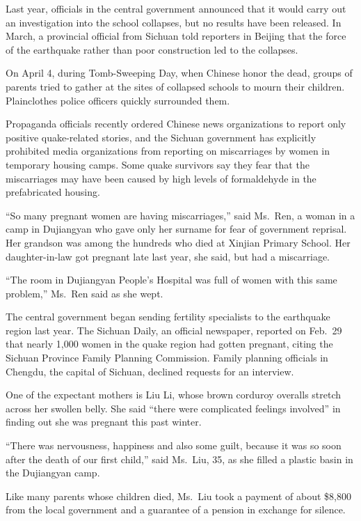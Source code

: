 \documentclass[12pt,a4paper,onecolumn]{article}
\begin{document}
Last year, officials in the central government announced that it would carry out an investigation
into the school collapses, but no results have been released. In March, a provincial official from
Sichuan told reporters in Beijing that the force of the earthquake rather than poor construction led
to the collapses.

On April 4, during Tomb-Sweeping Day, when Chinese honor the dead, groups of parents tried to gather
at the sites of collapsed schools to mourn their children. Plainclothes police officers quickly
surrounded them.

Propaganda officials recently ordered Chinese news organizations to report only positive
quake-related stories, and the Sichuan government has explicitly prohibited media organizations from
reporting on miscarriages by women in temporary housing camps. Some quake survivors say they fear
that the miscarriages may have been caused by high levels of formaldehyde in the prefabricated
housing.

``So many pregnant women are having miscarriages,'' said Ms.~Ren, a woman in a camp in Dujiangyan
who gave only her surname for fear of government reprisal. Her grandson was among the hundreds who
died at Xinjian Primary School. Her daughter-in-law got pregnant late last year, she said, but had a
miscarriage.

``The room in Dujiangyan People's Hospital was full of women with this same problem,'' Ms.~Ren said
as she wept.

The central government began sending fertility specialists to the earthquake region last year. The
Sichuan Daily, an official newspaper, reported on Feb.~29 that nearly 1,000 women in the quake
region had gotten pregnant, citing the Sichuan Province Family Planning Commission. Family planning
officials in Chengdu, the capital of Sichuan, declined requests for an interview.

One of the expectant mothers is Liu Li, whose brown corduroy overalls stretch across her swollen
belly. She said ``there were complicated feelings involved'' in finding out she was pregnant this
past winter.

``There was nervousness, happiness and also some guilt, because it was so soon after the death of
our first child,'' said Ms.~Liu, 35, as she filled a plastic basin in the Dujiangyan camp.

Like many parents whose children died, Ms.~Liu took a payment of about \$8,800 from the local
government and a guarantee of a pension in exchange for silence.
\end{document}
